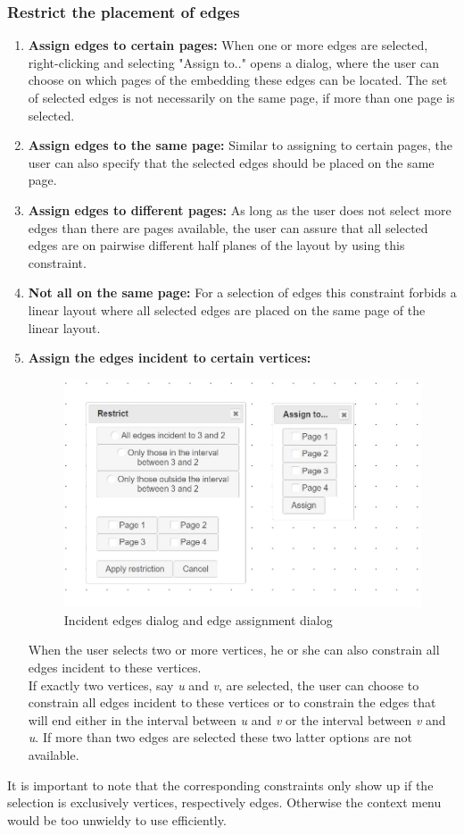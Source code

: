 {\subsubsection{Restrict the placement of edges}
\label{edgeRestr}
\begin{enumerate}
\item \textbf{Assign edges to certain pages:} 
When one or more edges are selected, right-clicking and selecting "Assign to.." opens a dialog, where the user can choose on which pages of the embedding these edges can be located. The set of selected edges is not necessarily on the same page, if more than one page is selected.  
\item \textbf{Assign edges to the same page:} Similar to assigning to certain pages, the user can also specify that the selected edges should be placed on the same page. 
\item \textbf{Assign edges to different pages:}
As long as the user does not select more edges than there are pages available, the user can assure that all selected edges are on pairwise different half planes of the layout by using this constraint.
\item \textbf{Not all on the same page:} For a selection of edges this constraint forbids a linear layout where all selected edges are placed on the same page of the linear layout. 
\item \textbf{Assign the edges incident to certain vertices:}
\begin{figure}
\includegraphics[width=\textwidth]{figures/figIndex/AssignAdj.jpg}
\caption{Incident edges dialog and edge assignment dialog}
\end{figure}
When the user selects two or more vertices, he or she can also constrain all edges incident to these vertices.\\
If exactly two vertices, say \textit{u} and \textit{v}, are selected, the user can choose to constrain all edges incident to these vertices or to constrain the edges that will end either in the interval between \textit{u} and \textit{v} or the interval between \textit{v} and \textit{u}. If more than two edges are selected these two latter options are not available.\\
\end{enumerate}
It is important to note that the corresponding constraints only show up if the selection is exclusively vertices, respectively edges. Otherwise the context menu would be too unwieldy to use efficiently. 
}
